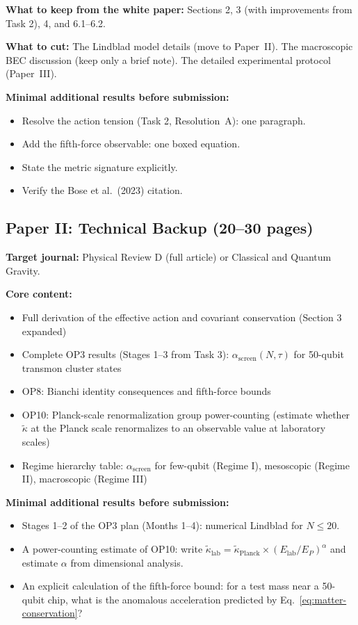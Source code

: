 \documentclass[12pt,letterpaper]{article}
\theoremstyle{plain}
\theoremstyle{definition}
\theoremstyle{remark}
\newcommand{\kt}{\tilde{\kappa}}
\newcommand{\asc}{\alpha_{\mathrm{screen}}}
\begin{document}
\textbf{What to keep from the white paper:} Sections 2, 3 (with improvements from Task 2), 4, and 6.1--6.2.

\textbf{What to cut:} The Lindblad model details (move to Paper~II). The macroscopic BEC discussion (keep only a brief note). The detailed experimental protocol (Paper~III).

\textbf{Minimal additional results before submission:}
\begin{itemize}
\item Resolve the action tension (Task 2, Resolution~A): one paragraph.
\item Add the fifth-force observable: one boxed equation.
\item State the metric signature explicitly.
\item Verify the Bose et al.\ (2023) citation.
\end{itemize}

\subsection{Paper II: Technical Backup (20--30 pages)}

\textbf{Target journal:} Physical Review D (full article) or Classical and Quantum Gravity.

\textbf{Core content:}
\begin{itemize}
\item Full derivation of the effective action and covariant conservation (Section 3 expanded)
\item Complete OP3 results (Stages 1--3 from Task 3): $\asc(N,\tau)$ for 50-qubit transmon cluster states
\item OP8: Bianchi identity consequences and fifth-force bounds
\item OP10: Planck-scale renormalization group power-counting (estimate whether $\kt$ at the Planck scale renormalizes to an observable value at laboratory scales)
\item Regime hierarchy table: $\asc$ for few-qubit (Regime I), mesoscopic (Regime II), macroscopic (Regime III)
\end{itemize}

\textbf{Minimal additional results before submission:}
\begin{itemize}
\item Stages 1--2 of the OP3 plan (Months 1--4): numerical Lindblad for $N \leq 20$.
\item A power-counting estimate of OP10: write $\kt_{\mathrm{lab}} = \kt_{\mathrm{Planck}} \times (E_{\mathrm{lab}}/E_P)^\alpha$ and estimate $\alpha$ from dimensional analysis.
\item An explicit calculation of the fifth-force bound: for a test mass near a 50-qubit chip, what is the anomalous acceleration predicted by Eq.~\eqref{eq:matter-conservation}?
\end{itemize}
\end{document}
